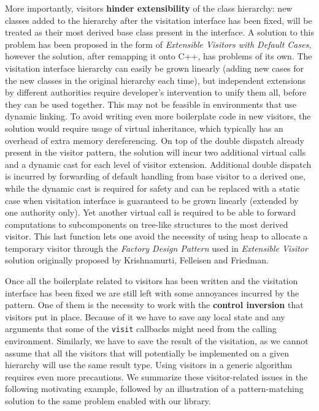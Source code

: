 \documentclass[preprint]{sigplanconf}
\DeclareRobustCommand{\code}[1]{{\lstinline[breaklines=false]{#1}}}
\begin{document}
More importantly, visitors {\bf hinder extensibility} of the class hierarchy: 
new classes added to the hierarchy after the visitation interface has been 
fixed, will be treated as their most derived base class present in the interface.
A solution to this problem has been proposed in the form of \emph{Extensible 
Visitors with Default Cases}\cite[]{Zenger:2001}, however the solution, after 
remapping it onto C++, has problems of its own. The visitation interface 
hierarchy can easily be grown linearly (adding new cases for the new classes in 
the original hierarchy each time), but independent extensions by different  
authorities require developer's intervention to unify them all, before they can 
be used together. This may not be feasible in environments that use dynamic 
linking. To avoid writing even more boilerplate code in new visitors, the 
solution would require usage of virtual inheritance, which typically has 
an overhead of extra memory dereferencing. On top of the double dispatch already 
present in the visitor pattern, the solution will incur two additional virtual 
calls and a dynamic cast for each level of visitor extension. Additional double 
dispatch is incurred by forwarding of default handling from base visitor to a 
derived one, while the dynamic cast is required for safety and can be replaced 
with a static case when visitation interface is guaranteed to be grown linearly 
(extended by one authority only). Yet another virtual call is required to be 
able to forward computations to subcomponents on tree-like structures to the 
most derived visitor. This last function lets one avoid the necessity of using 
heap to allocate a temporary visitor through the \emph{Factory Design 
Pattern}\cite{DesignPatterns1993} used in \emph{Extensible Visitor} solution 
originally proposed by Krishnamurti, Felleisen and Friedman\cite{Krishnamurthi98}.

Once all the boilerplate related to visitors has been written and the visitation 
interface has been fixed we are still left with some annoyances incurred by the 
pattern. One of them is the necessity to work with the {\bf control inversion} 
that visitors put in place. Because of it we have to save any local state and 
any arguments that some of the \code{visit} callbacks might need from the 
calling environment. Similarly, we have to save the result of the visitation, 
as we cannot assume that all the visitors that will potentially be implemented 
on a given hierarchy will use the same result type. Using visitors in a generic 
algorithm requires even more precautions. We summarize these visitor-related 
issues in the following motivating example, followed by an illustration of a 
pattern-matching solution to the same problem enabled with our library.
\end{document}
